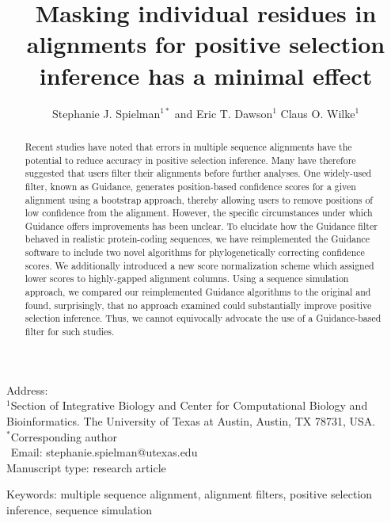 \documentclass[10pt]{article}
\begin{document}
\title{\textbf{Masking individual residues in alignments for positive selection inference has a minimal effect}}
\author{Stephanie J. Spielman$^{1*}$ and Eric T. Dawson$^{1}$ Claus O. Wilke$^{1}$}
\date{}

\maketitle
\noindent
Address:\\
$^1$Section of Integrative Biology and Center for Computational Biology and Bioinformatics. The University
of Texas at Austin, Austin, TX 78731, USA.\\

\bigskip
\noindent
$^*$Corresponding author\\
$\phantom{^*}$Email: stephanie.spielman@utexas.edu\\

\bigskip
\noindent
Manuscript type: research article

\bigskip
\noindent Keywords: multiple sequence alignment, alignment filters, positive selection inference, sequence simulation

\newpage
\begin{abstract}
 Recent studies have noted that errors in multiple sequence alignments have the potential to reduce accuracy in positive selection inference. Many have therefore suggested that users filter their alignments before further analyses. One widely-used filter, known as Guidance, generates position-based confidence scores for a given alignment using a bootstrap approach, thereby allowing users to remove positions of low confidence from the alignment. However, the specific circumstances under which Guidance offers improvements has been unclear. To elucidate how the Guidance filter behaved in realistic protein-coding sequences, we have reimplemented the Guidance software to include two novel algorithms for phylogenetically correcting confidence scores. We additionally introduced a new score normalization scheme which assigned lower scores to highly-gapped alignment columns. Using a sequence simulation approach, we compared our reimplemented Guidance algorithms to the original and found, surprisingly, that no approach examined could substantially improve positive selection inference. Thus, we cannot equivocally advocate the use of a Guidance-based filter for such studies.
\end{abstract}
\end{document}
